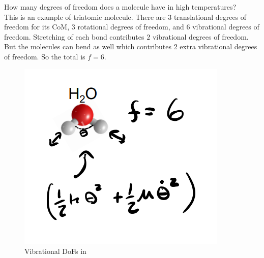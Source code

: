 \begin{texample}
	How many degrees of freedom does a  molecule have in high temperatures? \\
	
	This is an example of triatomic molecule. There are $3$ translational degrees of freedom for its CoM, $3$ rotational degrees of freedom, and $6$ vibrational degrees of freedom. Stretching of each bond contributes $2$ vibrational degrees of freedom. But the molecules can bend as well which contributes $2$ extra vibrational degrees of freedom. So the total is $f=6$.
	
	\begin{figure}[H]
		\centering
		\includegraphics[width=100mm]{19.png}
		\caption{Vibrational DoFs in }
	\end{figure}
\end{texample}


